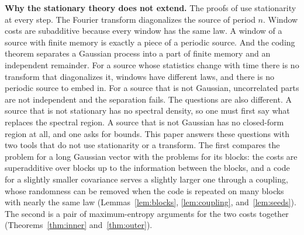 \documentclass[11pt,onecolumn]{IEEEtran}
\begin{document}
\textbf{Why the stationary theory does not extend.} The proofs of
\cite{part2} use stationarity at every step. The Fourier transform
diagonalizes the source of period $n$. Window costs are subadditive
because every window has the same law. A window of a source with
finite memory is exactly a piece of a periodic source. And the coding
theorem separates a Gaussian process into a part of finite memory and
an independent remainder. For a source whose statistics change with
time there is no transform that diagonalizes it, windows have
different laws, and there is no periodic source to embed in. For a
source that is not Gaussian, uncorrelated parts are not independent
and the separation fails. The questions are also different. A source
that is not stationary has no spectral density, so one must first say
what replaces the spectral region. A source that is not Gaussian has
no closed-form region at all, and one asks for bounds. This paper
answers these questions with two tools that do not use stationarity
or a transform. The first compares the problem for a long Gaussian
vector with the problems for its blocks: the costs are superadditive
over blocks up to the information between the blocks, and a code for
a slightly smaller covariance serves a slightly larger one through a
coupling, whose randomness can be removed when the code is repeated on
many blocks with nearly the same law (Lemmas~\ref{lem:blocks},
\ref{lem:coupling}, and~\ref{lem:seeds}). The second
is a pair of maximum-entropy arguments for the two costs together
(Theorems~\ref{thm:inner} and~\ref{thm:outer}).
\end{document}
